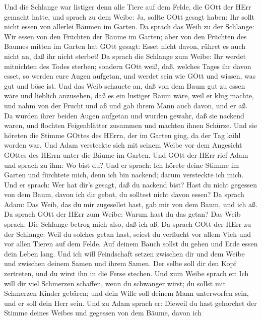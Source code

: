  Und die Schlange war listiger denn alle Tiere auf dem
Felde, die GOtt der HErr gemacht hatte, und sprach zu dem Weibe: Ja,
sollte GOtt gesagt haben: Ihr sollt nicht essen von allerlei Bäumen im
Garten.  Da sprach das Weib zu der Schlange: Wir essen von
den Früchten der Bäume im Garten;  aber von den Früchten des
Baumes mitten im Garten hat GOtt gesagt: Esset nicht davon, rühret es
auch nicht an, daß ihr nicht sterbet!  Da sprach die
Schlange zum Weibe: Ihr werdet mitnichten des Todes sterben;
 sondern GOtt weiß, daß, welches Tages ihr davon esset, so
werden eure Augen aufgetan, und werdet sein wie GOtt und wissen, was gut
und böse ist.  Und das Weib schauete an, daß von dem Baum
gut zu essen wäre und lieblich anzusehen, daß es ein lustiger Baum wäre,
weil er klug machte, und nahm von der Frucht und aß und gab ihrem Mann
auch davon, und er aß.  Da wurden ihrer beiden Augen
aufgetan und wurden gewahr, daß sie nackend waren, und flochten
Feigenblätter zusammen und machten ihnen Schürze.  Und sie
höreten die Stimme GOttes des HErrn, der im Garten ging, da der Tag kühl
worden war. Und Adam versteckte sich mit seinem Weibe vor dem Angesicht
GOttes des HErrn unter die Bäume im Garten.  Und GOtt der
HErr rief Adam und sprach zu ihm: Wo bist du?  Und er
sprach: Ich hörete deine Stimme im Garten und fürchtete mich, denn ich
bin nackend; darum versteckte ich mich.  Und er sprach: Wer
hat dir's gesagt, daß du nackend bist? Hast du nicht gegessen von dem
Baum, davon ich dir gebot, du solltest nicht davon essen? 
Da sprach Adam: Das Weib, das du mir zugesellet hast, gab mir von dem
Baum, und ich aß.  Da sprach GOtt der HErr zum Weibe: Warum
hast du das getan? Das Weib sprach: Die Schlange betrog mich also, daß
ich aß.  Da sprach GOtt der HErr zu der Schlange: Weil du
solches getan hast, seiest du verflucht vor allem Vieh und vor allen
Tieren auf dem Felde. Auf deinem Bauch sollst du gehen und Erde essen
dein Leben lang.  Und ich will Feindschaft setzen zwischen
dir und dem Weibe und zwischen deinem Samen und ihrem Samen. Der selbe
soll dir den Kopf zertreten, und du wirst ihn in die Ferse stechen.
 Und zum Weibe sprach er: Ich will dir viel Schmerzen
schaffen, wenn du schwanger wirst; du sollst mit Schmerzen Kinder
gebären; und dein Wille soll deinem Mann unterworfen sein, und er soll
dein Herr sein.  Und zu Adam sprach er: Dieweil du hast
gehorchet der Stimme deines Weibes und gegessen von dem Bäume, davon ich
